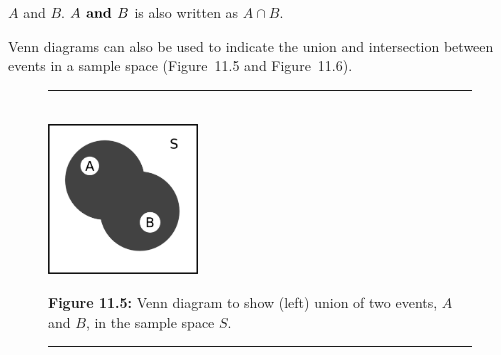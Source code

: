 $A$ and \begin{math}B\end{math}. 
$A\phantom{\rule{4pt}{0ex}}\mathbf{and}\phantom{\rule{4pt}{0ex}}B$ is also written as \begin{math}A\cap B\end{math}.\par \label{m39377*eip-429}Venn diagrams can also be used to indicate the
union and intersection between events in a sample space (Figure~11.5 and Figure~11.6).\par 
    \setcounter{subfigure}{0}
	\begin{figure}[H] %
    \begin{center}
    \rule[.1in]{\figurerulewidth}{.005in} \\
        \label{m39377*uid13!!!underscore!!!media}\label{m39377*uid13!!!underscore!!!printimage}\includegraphics[width=150px]{col11306.imgs/m39377_union.png} %
      \vspace{2pt}
    \vspace{\rubberspace}\par \begin{cnxcaption}
	  \small \textbf{Figure 11.5: }Venn diagram to show (left) union of two events, $A$ and \begin{math}B\end{math}, in the sample space \begin{math}S\end{math}.
	\end{cnxcaption}
    \vspace{.1in}
    \rule[.1in]{\figurerulewidth}{.005in} \\
    \end{center}
 \end{figure}       
    \setcounter{subfigure}{0}
